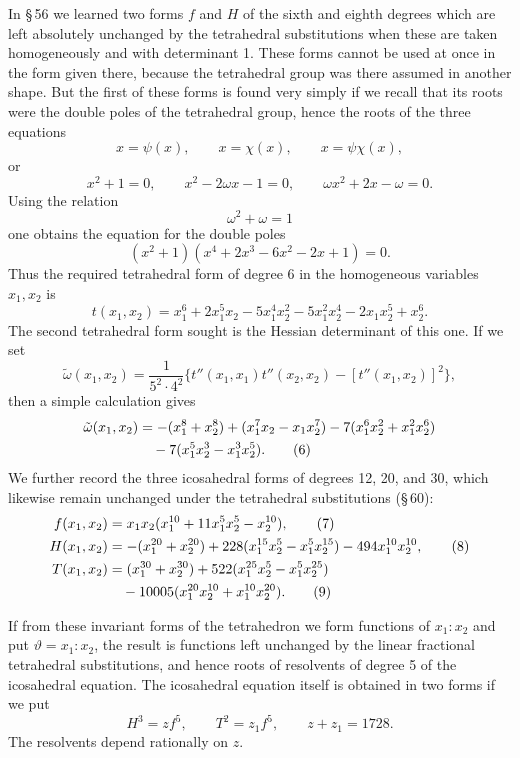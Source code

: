\documentclass[11pt]{article}
\begin{document}
In \S\,56 we learned two forms \(f\) and \(H\) of the sixth and eighth degrees which are left absolutely unchanged by the tetrahedral substitutions when these are taken homogeneously and with determinant 1. These forms cannot be used at once in the form given there, because the tetrahedral group was there assumed in another shape. But the first of these forms is found very simply if we recall that its roots were the double poles of the tetrahedral group, hence the roots of the three equations
\[
x=\psi(x),\qquad x=\chi(x),\qquad x=\psi\chi(x),
\]
or
\[
x^2+1=0,
\qquad
x^2-2\omega x-1=0,
\qquad
\omega x^2+2x-\omega=0.
\]
Using the relation
\[
\omega^2+\omega=1
\]
one obtains the equation for the double poles
\[
(x^2+1)(x^4+2x^3-6x^2-2x+1)=0.
\]
Thus the required tetrahedral form of degree 6 in the homogeneous variables \(x_1,x_2\) is
\begin{equation}
t(x_1,x_2)=x_1^6+2x_1^5x_2-5x_1^4x_2^2-5x_1^2x_2^4-2x_1x_2^5+x_2^6.
\tag{5}
\end{equation}
The second tetrahedral form sought is the Hessian determinant of this one. If we set
\[
\tilde\omega(x_1,x_2)=\frac{1}{5^2\cdot4^2}\{t''(x_1,x_1)t''(x_2,x_2)-[t''(x_1,x_2)]^2\},
\]
then a simple calculation gives
\begin{align}
\tilde\omega(x_1,x_2)&=-(x_1^8+x_2^8)+(x_1^7x_2-x_1x_2^7)-7(x_1^6x_2^2+x_1^2x_2^6)\notag\\
&\quad -7(x_1^5x_2^3-x_1^3x_2^5).
\tag{6}
\end{align}
We further record the three icosahedral forms of degrees 12, 20, and 30, which likewise remain unchanged under the tetrahedral substitutions (\S\,60):
\begin{align}
f(x_1,x_2)&=x_1x_2(x_1^{10}+11x_1^5x_2^5-x_2^{10}),\tag{7}\\
H(x_1,x_2)&=-(x_1^{20}+x_2^{20})+228(x_1^{15}x_2^5-x_1^5x_2^{15})-494x_1^{10}x_2^{10},\tag{8}\\
T(x_1,x_2)&=(x_1^{30}+x_2^{30})+522(x_1^{25}x_2^5-x_1^5x_2^{25})\notag\\
&\quad-10005(x_1^{20}x_2^{10}+x_1^{10}x_2^{20}).\tag{9}
\end{align}

If from these invariant forms of the tetrahedron we form functions of \(x_1:x_2\) and put \(\vartheta=x_1:x_2\), the result is functions left unchanged by the linear fractional tetrahedral substitutions, and hence roots of resolvents of degree 5 of the icosahedral equation. The icosahedral equation itself is obtained in two forms if we put
\begin{equation}
H^3=zf^5,
\qquad
T^2=z_1f^5,
\qquad
z+z_1=1728.
\tag{10}
\end{equation}
The resolvents depend rationally on \(z\).
\end{document}
